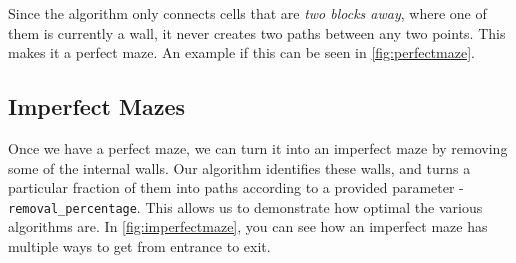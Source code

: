 \documentclass{article}
\begin{document}
Since the algorithm only connects cells that are \textit{two blocks away}, where one of them is currently a wall, it never creates two paths between any two points.  This makes it a perfect maze. An example if this can be seen in \autoref{fig:perfectmaze}.

\subsection{Imperfect Mazes}

Once we have a perfect maze, we can turn it into an imperfect maze by removing some of the internal walls. Our algorithm identifies these walls, and turns a particular fraction of them into paths according to a provided parameter - \texttt{removal\_percentage}. This allows us to demonstrate how optimal the various algorithms are. In \autoref{fig:imperfectmaze}, you can see how an imperfect maze has multiple ways to get from entrance to exit.
\end{document}
